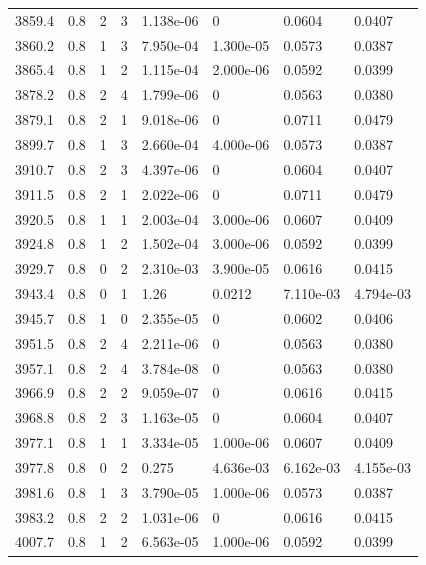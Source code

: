 \documentclass[preview]{standalone}
\begin{document}
{{{{{{{{{{{\begin{tabular}{L{1.2cm}C{1.2cm} C{0.3cm}C{0.5cm} C{1.4cm}C{1.4cm} C{1.4cm}C{1.4cm}}
  3859.4  &   0.8  & 2     &  3 &  1.138e-06  & 0  & 0.0604 &  0.0407   \\ 
  3860.2  &   0.8  & 1     &  3 &  7.950e-04  & 1.300e-05  & 0.0573 &  0.0387   \\ 
  3865.4  &   0.8  & 1     &  2 &  1.115e-04  & 2.000e-06  & 0.0592 &  0.0399   \\ 
  3878.2  &   0.8  & 2     &  4 &  1.799e-06  & 0  & 0.0563 &  0.0380   \\ 
  3879.1  &   0.8  & 2     &  1 &  9.018e-06  & 0  & 0.0711 &  0.0479   \\ 
  3899.7  &   0.8  & 1     &  3 &  2.660e-04  & 4.000e-06  & 0.0573 &  0.0387   \\ 
  3910.7  &   0.8  & 2     &  3 &  4.397e-06  & 0  & 0.0604 &  0.0407   \\ 
  3911.5  &   0.8  & 2     &  1 &  2.022e-06  & 0  & 0.0711 &  0.0479   \\ 
  3920.5  &   0.8  & 1     &  1 &  2.003e-04  & 3.000e-06  & 0.0607 &  0.0409   \\ 
  3924.8  &   0.8  & 1     &  2 &  1.502e-04  & 3.000e-06  & 0.0592 &  0.0399   \\ 
  3929.7  &   0.8  & 0     &  2 &  2.310e-03  & 3.900e-05  & 0.0616 &  0.0415   \\ 
  3943.4  &   0.8  & 0     &  1 &  1.26  & 0.0212  & 7.110e-03 &  4.794e-03   \\ 
  3945.7  &   0.8  & 1     &  0 &  2.355e-05  & 0  & 0.0602 &  0.0406   \\ 
  3951.5  &   0.8  & 2     &  4 &  2.211e-06  & 0  & 0.0563 &  0.0380   \\ 
  3957.1  &   0.8  & 2     &  4 &  3.784e-08  & 0  & 0.0563 &  0.0380   \\ 
  3966.9  &   0.8  & 2     &  2 &  9.059e-07  & 0  & 0.0616 &  0.0415   \\ 
  3968.8  &   0.8  & 2     &  3 &  1.163e-05  & 0  & 0.0604 &  0.0407   \\ 
  3977.1  &   0.8  & 1     &  1 &  3.334e-05  & 1.000e-06  & 0.0607 &  0.0409   \\ 
  3977.8  &   0.8  & 0     &  2 &  0.275  & 4.636e-03  & 6.162e-03 &  4.155e-03   \\ 
  3981.6  &   0.8  & 1     &  3 &  3.790e-05  & 1.000e-06  & 0.0573 &  0.0387   \\ 
  3983.2  &   0.8  & 2     &  2 &  1.031e-06  & 0  & 0.0616 &  0.0415   \\ 
  4007.7  &   0.8  & 1     &  2 &  6.563e-05  & 1.000e-06  & 0.0592 &  0.0399   \\ 

\end{tabular}}}}}}}}}}}}
\end{document}
